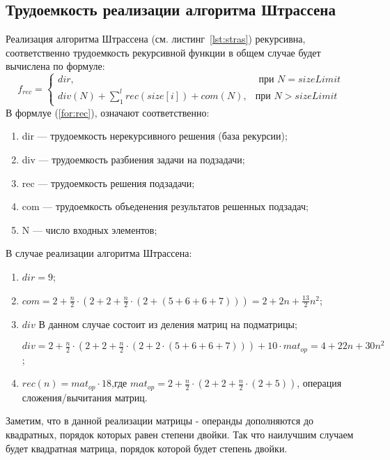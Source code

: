 \subsection{Трудоемкость реализации алгоритма Штрассена}
Реализация алгоритма Штрассена (см. листинг~\ref{lst:stras}) рекурсивна, соответственно трудоемкость рекурсивной функции в общем случае будет вычислена по формуле:
\begin{equation}
	\label{for:rec}
	f_{rec} =
	\begin{cases}
		dir, & \text{ при $N = sizeLimit$}\\
		div(N) +\sum_{1}^{l}{rec(size[i])} + com(N), & \text{при $N> sizeLimit$}
	\end{cases}
\end{equation}
В формлуе (\ref{for:rec}), означают соответственно:
\begin{enumerate}
	\item dir --- трудоемкость нерекурсивного решения (база рекурсии);
	\item div --- трудоемкость разбиения задачи на подзадачи;
	\item rec --- трудоемкость решения подзадачи;
	\item com --- трудоемкость объеденения результатов решенных подзадач;
	\item N --- число входных элементов;
\end{enumerate}


В случае реализации алгоритма Штрассена:
\begin{enumerate}
	\item $dir  = 9$;
	\item $com =  2 + \frac{n}{2} \cdot (2 + 2 + \frac{n}{2} \cdot (2 +  (5 + 6 + 6 + 7))) = 2 +2n + \frac{13}{2}n^2$;
	\item $div$ В данном случае состоит из деления матриц на подматрицы;
	
	$div = 2 + \frac{n}{2} \cdot (2 + 2 + \frac{n}{2} \cdot (2 + 2 \cdot (5 + 6 + 6 + 7))) +10 \cdot mat_{op} = 4 + 22n + 30n^{2}$;

	\item $rec(n) = mat_{op} \cdot 18$,где $mat_{op} = 2 + \frac{n}{2} \cdot (2 + 2 + \frac{n}{2} \cdot (2 +5))$, операция сложения/вычитания матриц.
\end{enumerate}
Заметим, что в данной реализации матрицы - операнды дополняются до квадратных, порядок которых равен степени двойки. Так что наилучшим случаем будет квадратная матрица, порядок которой будет степень двойки.




